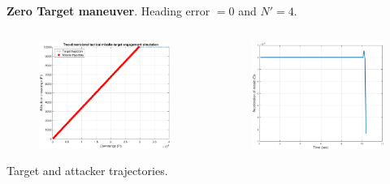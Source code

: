 \documentclass{beamer}
\begin{document}
\begin{frame}
\textbf{Zero Target maneuver}. Heading error $=0$ and $N'= 4$.
\begin{columns}[c]
	\begin{column}{.3\linewidth}
		\begin{figure}[H]
			\centering
			\includegraphics[scale = 0.165]{fig/trajectoryXNT0HE0N4.pdf}
			\label{trajectoryXNT0HE0N4}
		\end{figure}
	Target and attacker trajectories.
	\end{column}
	\begin{column}{.3\linewidth}
		\begin{figure}[H]
			\centering
			\includegraphics[scale = 0.175]{fig/MissileAccelerationXNT0HE0N4.pdf}

\end{figure}
\end{column}
\end{columns}
\end{frame}
\end{document}
